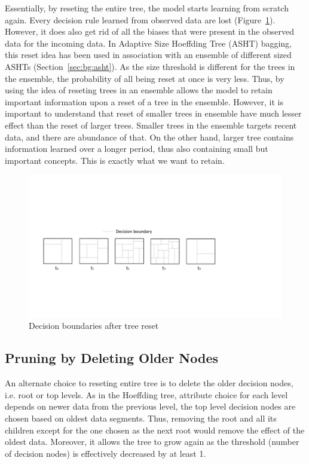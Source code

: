 Essentially, by reseting the entire tree, the model starts learning from scratch again. Every decision rule learned from observed data are lost (Figure~\ref{fig:algo:resetdb}). However, it does also get rid of all the biases that were present in the observed data for the incoming data. In Adaptive Size Hoeffding Tree (ASHT) bagging, this reset idea has been used in association with an ensemble of different sized ASHTs (Section~\ref{sec:bg:asht}). As the size threshold is different for the trees in the ensemble, the probability of all being reset at once is very less. Thus, by using the idea of reseting trees in an ensemble allows the model to retain important information upon a reset of a tree in the ensemble. However, it is important to understand that reset of smaller trees in ensemble have much lesser effect than the reset of larger trees. Smaller trees in the ensemble targets recent data, and there are abundance of that. On the other hand, larger tree contains information learned over a longer period, thus also containing small but important concepts. This is exactly what we want to retain.

\begin{figure}[htbp]
    \begin{center}
        \includegraphics[width=14.0cm]{figs/resetdb.pdf}
        \caption{Decision boundaries after tree reset}
        \label{fig:algo:resetdb}
    \end{center}
\end{figure}

\subsection{Pruning by Deleting Older Nodes}
An alternate choice to reseting entire tree is to delete the older decision nodes, i.e. root or top levels. As in the Hoeffding tree, attribute choice for each level depends on newer data from the previous level, the top level decision nodes are chosen based on oldest data segments. Thus, removing the root and all its children except for the one chosen as the next root would remove the effect of the oldest data. Moreover, it allows the tree to grow again as the threshold (number of decision nodes) is effectively decreased by at least 1.

